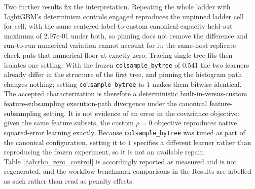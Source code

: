 \documentclass[10pt]{article}
\theoremstyle{definition}
\newcommand{\1}{\mathbf{1}}
\begin{document}
Two further results fix the interpretation. Repeating the whole ladder with LightGBM's
determinism controls engaged reproduces the unpinned ladder cell for cell, with the same
centered-label-to-custom canonical-capacity held-out maximum of 2.97e-01 under both, so pinning
does not remove the difference and
run-to-run numerical variation cannot account for it; the same-host replicate check puts that
numerical floor at exactly zero. Tracing single-tree fits then isolates one setting. With the frozen
\texttt{colsample\_bytree} of 0.541 the two learners already differ in the structure of the first
tree, and pinning the histogram path changes nothing; setting \texttt{colsample\_bytree} to $1$ makes
them bitwise identical. The accepted characterization is therefore a deterministic
built-in-versus-custom feature-subsampling execution-path divergence under the canonical
feature-subsampling setting. It is not evidence of an error in the covariance objective: given the
same feature subsets, the custom $\rho=0$ objective reproduces native squared-error learning exactly.
Because \texttt{colsample\_bytree} was tuned as part of the canonical configuration, setting it to $1$
specifies a different learner rather than reproducing the frozen experiment, so it is not an
available repair. Table~\ref{tab:rho_zero_control} is accordingly reported as measured and is not
regenerated, and the workflow-benchmark comparisons in the Results are labelled as such rather than
read as penalty effects.
\end{document}

